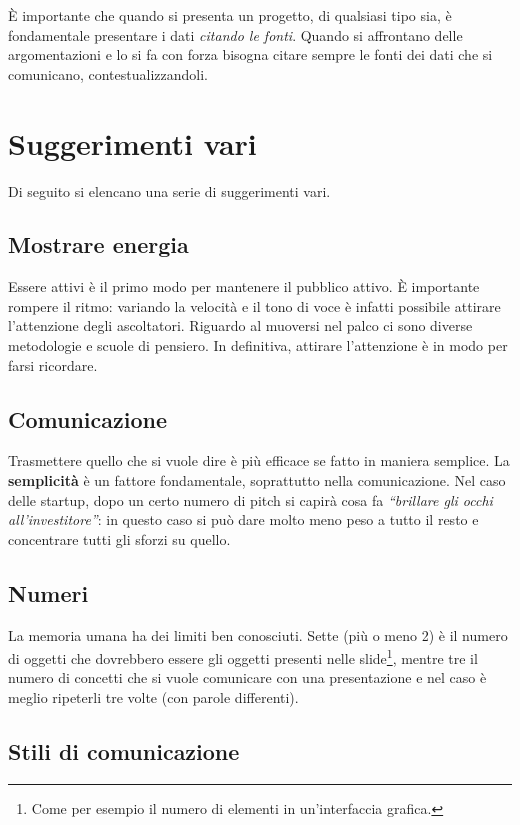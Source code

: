 È importante che quando si presenta un progetto, di qualsiasi tipo sia, è
fondamentale presentare i dati \textit{citando le fonti}.
Quando si affrontano delle argomentazioni e lo si fa con forza bisogna citare
sempre le fonti dei dati che si comunicano, contestualizzandoli.

\section{Suggerimenti vari}

Di seguito si elencano una serie di suggerimenti vari.

\subsection{Mostrare energia}

Essere attivi è il primo modo per mantenere il pubblico attivo. È
importante rompere il ritmo: variando la velocità e il tono di voce è
infatti possibile attirare l'attenzione degli ascoltatori. Riguardo al
muoversi nel palco ci sono diverse metodologie e scuole di pensiero. In
definitiva, attirare l'attenzione è in modo per farsi ricordare.

\subsection{Comunicazione}

Trasmettere quello che si vuole dire è più efficace se fatto in maniera
semplice. La \textbf{semplicità} è un fattore fondamentale, soprattutto nella
comunicazione. Nel caso delle startup, dopo un certo numero di pitch si capirà
cosa fa \emph{``brillare gli occhi all'investitore''}: in questo caso si può dare
molto meno peso a tutto il resto e concentrare tutti gli sforzi su quello.

\subsection{Numeri}

La memoria umana ha dei limiti ben conosciuti. Sette (più o meno 2) è il numero
di oggetti che dovrebbero essere gli oggetti presenti nelle slide\footnote{Come
per esempio il numero di elementi in un'interfaccia grafica.}, mentre tre il
numero di concetti che si vuole comunicare con una presentazione e nel caso è
meglio ripeterli tre volte (con parole differenti).

\subsection{Stili di comunicazione}


